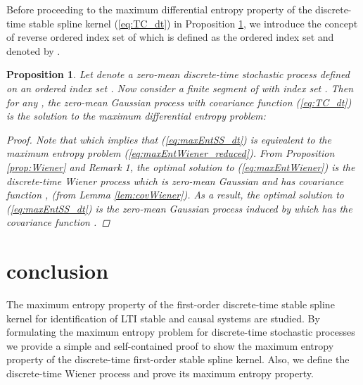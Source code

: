 \documentclass{article}
\newtheorem{prop}{Proposition}
\begin{document}
Before proceeding to the maximum differential entropy  property of
the discrete-time stable spline kernel (\ref{eq:TC_dt}) in
Proposition \ref{prop:DTstablespline}, we introduce the concept of
reverse ordered index set of 
which is defined as the ordered index set 
and denoted by .

\begin{prop}
\label{prop:DTstablespline} Let  denote a zero-mean
discrete-time stochastic process defined on an ordered index set
. Now consider a finite segment of  with index set
. Then for any , the zero-mean Gaussian process with
covariance function (\ref{eq:TC_dt}) is the solution to the maximum
differential entropy problem:

\begin{proof} Note that 
which implies that (\ref{eq:maxEntSS_dt}) is equivalent to the
maximum entropy problem (\ref{eq:maxEntWiener_reduced}). From
Proposition \ref{prop:Wiener} and Remark 1, the optimal solution to
(\ref{eq:maxEntWiener}) is the discrete-time Wiener process 
which is zero-mean Gaussian and has covariance function
,  (from Lemma
\ref{lem:covWiener}). As a result, the optimal solution to
(\ref{eq:maxEntSS_dt}) is the zero-mean Gaussian process induced by
 which has the covariance function
.
\end{proof}
\end{prop}


\section{conclusion}
The maximum entropy property of the first-order discrete-time stable spline
kernel for identification of LTI stable and causal systems are
studied. By formulating the maximum entropy problem for
discrete-time stochastic processes we provide a simple and
self-contained proof to show  the maximum entropy property of the
discrete-time first-order stable spline kernel. Also, we define the
discrete-time Wiener process and prove its maximum entropy property.



\end{document}

